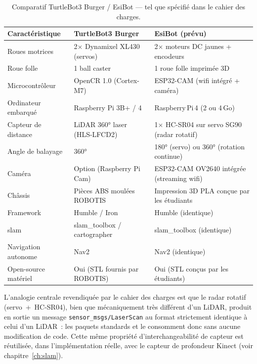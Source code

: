 \begin{table}[H]
	\centering
	\caption{Comparatif TurtleBot3 Burger / EsiBot --- tel que spécifié dans le cahier des charges.}
	\label{tab:tb3_compare_spec}
	\renewcommand{\arraystretch}{1.3}
	\begin{tabularx}{\linewidth}{L{3.4cm} L{4.4cm} L{4.8cm}}
		\toprule
		\textbf{Caractéristique} & \textbf{TurtleBot3 Burger}        & \textbf{EsiBot (prévu)}                        \\
		\midrule
		Roues motrices            & 2$\times$ Dynamixel XL430 (servos) & 2$\times$ moteurs DC jaunes + encodeurs        \\
		Roue folle                & 1 ball caster                      & 1 roue folle imprimée 3D                       \\
		Microcontrôleur           & OpenCR 1.0 (Cortex-M7)             & ESP32-CAM (\gls{wifi} intégré + caméra)        \\
		Ordinateur embarqué       & Raspberry Pi 3B+ / 4               & Raspberry\,Pi\,4 (2 ou 4\,Go)                  \\
		Capteur de distance       & LiDAR 360° laser (HLS-LFCD2)        & 1$\times$ HC-SR04 sur servo SG90 (radar rotatif) \\
		Angle de balayage         & 360°                                & 180° (servo) ou 360° (rotation continue)        \\
		Caméra                    & Option (Raspberry Pi Cam)          & ESP32-CAM OV2640 intégrée (streaming \gls{wifi}) \\
		Châssis                   & Pièces ABS moulées ROBOTIS          & Impression 3D PLA conçue par les étudiants     \\
		Framework                 & \ros{} Humble / Iron                & \ros{} Humble (identique)                       \\
		\gls{slam}                & slam\_toolbox / cartographer        & slam\_toolbox (identique)                       \\
		Navigation autonome       & Nav2                                & Nav2 (identique)                                \\
		Open-source matériel      & Oui (STL fournis par ROBOTIS)       & Oui (STL conçus par les étudiants)              \\
		\bottomrule
	\end{tabularx}
\end{table}

L'analogie centrale revendiquée par le cahier des charges est que le radar rotatif
(servo~+~HC-SR04), bien que mécaniquement très différent d'un LiDAR, produit en sortie un
message \texttt{sensor\_msgs/LaserScan} au format strictement identique à celui d'un
LiDAR~: les paquets standards  et  le consomment donc sans
aucune modification de code. Cette même propriété d'interchangeabilité de capteur est
réutilisée, dans l'implémentation réelle, avec le capteur de profondeur Kinect (voir
chapitre~\ref{ch:slam}).

